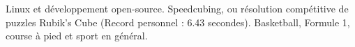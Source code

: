 \documentclass[10pt,a4paper]{article} %
\begin{document}

\spacedhrule{1.6em}{-0.4em} %


{Linux et développement open-source. Speedcubing, ou résolution compétitive de puzzles Rubik's Cube
    (Record personnel : 6.43 secondes). Basketball, Formule 1, course à pied et sport en général.}

\end{document}
